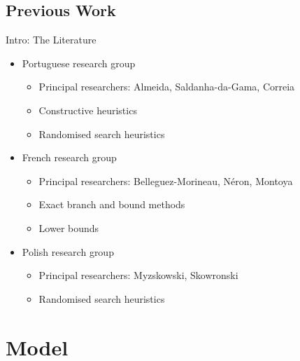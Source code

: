 \documentclass{beamer}
\begin{document}
\subsection{Previous Work}
\begin{frame}{Intro: The Literature}
	\begin{itemize}
		\item Portuguese research group
		\begin{itemize}
			\item Principal researchers: Almeida, Saldanha-da-Gama, Correia
			\vspace{1mm}
			\item Constructive heuristics
			\vspace{1mm}
			\item Randomised search heuristics\pause
		\end{itemize}
		\vspace{2mm}
		\item French research group
		\begin{itemize}
			\item Principal researchers: Belleguez-Morineau, N\'{e}ron, Montoya
			\vspace{1mm}
			\item Exact branch and bound methods
			\vspace{1mm}
			\item Lower bounds\pause
		\end{itemize}	
		\vspace{2mm}
		\item Polish research group
		\begin{itemize}
			\item Principal researchers: Myzskowski, Skowronski
			\vspace{1mm}
			\item Randomised search heuristics
		\end{itemize}
	\end{itemize}
\end{frame}


\section{Model}
\end{document}
